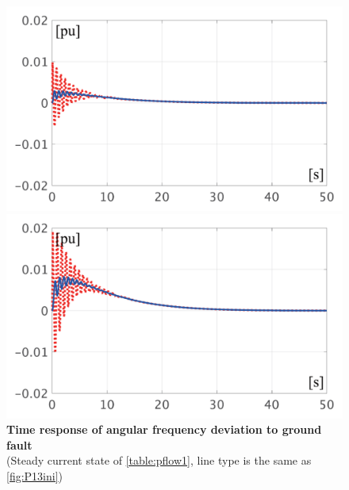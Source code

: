 \documentclass[tombow,dvipdfmx]{corona-a5-1.1}
\begin{document}
\begin{figure}[t]
  \centering
  {
  \begin{minipage}{0.49\linewidth}
    \centering
    \includegraphics[width = 1.0\linewidth]{figs/50mP1}
  \end{minipage}
  \begin{minipage}{0.49\linewidth}
    \centering
    \includegraphics[width = 1.0\linewidth]{figs/100mP1}
  \end{minipage}
  \medskip
  \caption{\textbf{Time response of angular frequency deviation to ground fault}
  \\ \centering (Steady current state of \ref{table:pflow1}, line type is the same as \ref{fig:P13ini})}
  \label{fig:P1fault}
  }
\medskip
\end{figure}
\end{document}
